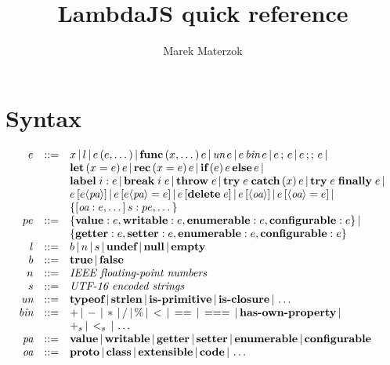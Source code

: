 \documentclass[draft, 10pt]{article}
\title{LambdaJS quick reference}
\author{Marek Materzok}
\newcommand{\expr}[0]{e}
\newcommand{\var}[0]{x}
\newcommand{\lit}[0]{l}
\newcommand{\bool}[0]{b}
\newcommand{\num}[0]{n}
\newcommand{\str}[0]{s}
\newcommand{\id}[0]{i}
\newcommand{\eprop}[0]{pe}
\newcommand{\undef}[0]{\textbf{undef}}
\newcommand{\nul}[0]{\textbf{null}}
\newcommand{\empt}[0]{\textbf{empty}}
\newcommand{\true}[0]{\textbf{true}}
\newcommand{\false}[0]{\textbf{false}}
\newcommand{\unop}[0]{\textit{un}}
\newcommand{\binop}[0]{\textit{bin}}
\newcommand{\pattr}[0]{\textit{pa}}
\newcommand{\oattr}[0]{\textit{oa}}
\newcommand{\pavalue}[0]{\textbf{value}}
\newcommand{\pawritable}[0]{\textbf{writable}}
\newcommand{\paget}[0]{\textbf{getter}}
\newcommand{\paset}[0]{\textbf{setter}}
\newcommand{\paenum}[0]{\textbf{enumerable}}
\newcommand{\paconfig}[0]{\textbf{configurable}}
\newcommand{\oaproto}[0]{\textbf{proto}}
\newcommand{\oaclass}[0]{\textbf{class}}
\newcommand{\oaextens}[0]{\textbf{extensible}}
\newcommand{\oacode}[0]{\textbf{code}}
\newcommand{\unap}[1]{\unop \thinspace #1}
\newcommand{\binap}[2]{#1 \thinspace \binop \thinspace #2}
\newcommand{\ap}[2]{#1\thinspace(#2)}
\newcommand{\func}[2]{\textbf{func}\thinspace(#1)\thinspace #2}
\newcommand{\seq}[2]{#1 \thinspace ; \thinspace #2}
\newcommand{\jseq}[2]{#1 \thinspace ;; \thinspace #2}
\newcommand{\letdef}[3]{\textbf{let} \thinspace (#1 = #2) \thinspace #3}
\newcommand{\recdef}[3]{\textbf{rec} \thinspace (#1 = #2) \thinspace #3}
\newcommand{\ife}[3]{\textbf{if} \thinspace (#1) \thinspace #2 \thinspace \textbf{else} \thinspace #3}
\newcommand{\lbl}[2]{\textbf{label} \thickspace #1: #2}
\newcommand{\brk}[2]{\textbf{break} \thickspace #1 \thickspace #2}
\newcommand{\throw}[1]{\textbf{throw} \thickspace #1}
\newcommand{\trycatch}[3]{\textbf{try} \thickspace #1 \thickspace \textbf{catch}\thinspace(#2) \thinspace #3}
\newcommand{\tryfin}[2]{\textbf{try} \thickspace #1 \thickspace \textbf{finally} \thickspace #2}
\newcommand{\getattr}[3]{#2 \thinspace [ #3 \langle #1 \rangle ] }
\newcommand{\setattr}[4]{#2 \thinspace [ #3 \langle #1 \rangle = #4 ] }
\newcommand{\delattr}[2]{#1 \thinspace [ \textbf{delete} \thickspace #2 ]}
\newcommand{\getoattr}[2]{#2 \thinspace [ \langle #1 \rangle ]}
\newcommand{\setoattr}[3]{#2 \thinspace [ \langle #1 \rangle = #3 ]}
\newcommand{\bnfsep}[0]{\thinspace | \thinspace}
\newcommand{\optypeof}[0]{\textbf{typeof}}
\newcommand{\opstrlen}[0]{\textbf{strlen}}
\newcommand{\opisprim}[0]{\textbf{is-primitive}}
\newcommand{\opisclosure}[0]{\textbf{is-closure}}
\newcommand{\ophasprop}[0]{\textbf{has-own-property}}
\newcommand{\opstrplus}[0]{+_{\str}}
\newcommand{\opstrlt}[0]{<_{\str}}
\begin{document}
\maketitle

\section{Syntax}

\[
\begin{array}{rcl}
\expr & ::= & \var \bnfsep \lit \bnfsep \ap{\expr}{\expr, \dots} \bnfsep
              \func{\var, \dots}{\expr} \bnfsep
              \unap{\expr} \bnfsep \binap{\expr}{\expr} \bnfsep
              \seq{\expr}{\expr} \bnfsep \jseq{\expr}{\expr} \bnfsep \\
          & & \letdef{\var}{\expr}{\expr} \bnfsep \recdef{\var}{\expr}{\expr} \bnfsep
              \ife{\expr}{\expr}{\expr} \bnfsep \\
          & & \lbl{\id}{\expr} \bnfsep \brk{\id}{\expr} \bnfsep
              \throw{\expr} \bnfsep \trycatch{\expr}{\var}{\expr} \bnfsep \tryfin{\expr}{\expr} \bnfsep \\
          & & \getattr{\pattr}{\expr}{\expr} \bnfsep \setattr{\pattr}{\expr}{\expr}{\expr} \bnfsep
              \delattr{\expr}{\expr} \bnfsep \getoattr{\oattr}{\expr} \bnfsep 
              \setoattr{\oattr}{\expr}{\expr} \bnfsep \\
          & & \{[\oattr: \expr, \dots] \thinspace \str : \eprop, \dots \} \\
\eprop & ::= & \{\pavalue : \expr, \pawritable : \expr, \paenum : \expr, \paconfig : \expr \} \bnfsep \\
           & & \{\paget : \expr, \paset : \expr, \paenum : \expr, \paconfig : \expr \} \\
\lit & ::= & \bool \bnfsep \num \bnfsep \str \bnfsep \undef \bnfsep \nul \bnfsep \empt \\
\bool & ::= & \true \bnfsep \false \\
\num & ::= & \textit{IEEE floating-point numbers} \\
\str & ::= & \textit{UTF-16 encoded strings} \\
\unop & ::= & \optypeof \bnfsep \opstrlen \bnfsep \opisprim \bnfsep \opisclosure \bnfsep \dots \\
\binop & ::= & + \bnfsep - \bnfsep * \bnfsep / \bnfsep \% \bnfsep < \bnfsep == \bnfsep === \bnfsep 
               \ophasprop \bnfsep \\
           & & \opstrplus \bnfsep \opstrlt \bnfsep \dots \\
\pattr & ::= & \pavalue \bnfsep \pawritable \bnfsep \paget \bnfsep \paset \bnfsep
               \paenum \bnfsep \paconfig \\
\oattr & ::= & \oaproto \bnfsep \oaclass \bnfsep \oaextens \bnfsep \oacode \bnfsep \dots
\end{array}
\]
\end{document}
